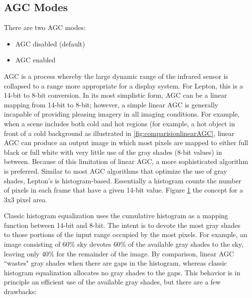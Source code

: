 \subsection{AGC Modes}
\label{ssec:AGCModes}
There are two AGC modes:
\begin{itemize}
    \item AGC disabled (default)
    \item AGC enabled
\end{itemize}
AGC is a process whereby the large dynamic range of the infrared sensor is
collapsed to a range more appropriate for a display system. For Lepton, this is
a 14-bit to 8-bit conversion. In its most simplistic form, AGC can be a linear
mapping from 14-bit to 8-bit; however, a simple linear AGC is generally
incapable of providing pleasing imagery in all imaging conditions. For example,
when a scene includes both cold and hot regions (for example, a hot object in
front of a cold background as illustrated in \ref{fig:comparisionlinearAGC},
linear AGC can produce an output image in which most pixels are mapped to either
full black or full white with very little use of the gray shades (8-bit values)
in between. Because of this limitation of linear AGC, a more sophisticated
algorithm is preferred. Similar to most AGC algorithms that optimize the use of
gray shades, Lepton's is histogram-based. Essentially a histogram counts the
number of pixels in each frame that have a given 14-bit value. Figure
\ref{fig:histogram} the concept for a 3x3 pixel area.\linebreak
%
\begin{figure}[!h]
    \centering
    \resizebox{0.80\textwidth}{!}{}
    \label{fig:histogram}
\end{figure}
%
Classic histogram equalization uses the cumulative histogram as a
mapping function between 14-bit and 8-bit. The intent is to devote the most gray
shades to those portions of the input range occupied by the most pixels. For
example, an image consisting of $60 \%$ sky devotes $60 \%$ of the available
gray shades to the sky, leaving only $40 \%$ for the remainder of the image. By
comparison, linear AGC ``wastes" gray shades when there are gaps in the
histogram, whereas classic histogram equalization allocates no gray shades to
the gaps. This behavior is in principle an efficient use of the available gray
shades, but there are a few drawbacks:
